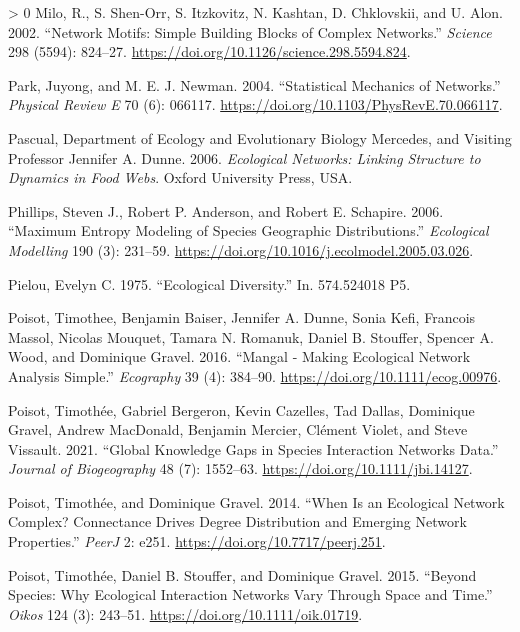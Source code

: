 \documentclass[11pt]{article}
\newlength{\cslhangindent}
\newenvironment{CSLReferences}[3] %
 {%
  \setlength{\parindent}{0pt}
  \ifodd #1 \everypar{\setlength{\hangindent}{\cslhangindent}}\ignorespaces\fi
  \ifnum #2 > 0
  \setlength{\parskip}{#2\baselineskip}
  \fi
 }%
 {}
\begin{document}
\begin{CSLReferences}{1}{0}
\leavevmode\hypertarget{ref-Milo2002NetMot}{}%
Milo, R., S. Shen-Orr, S. Itzkovitz, N. Kashtan, D. Chklovskii, and U.
Alon. 2002. {``Network Motifs: Simple Building Blocks of Complex
Networks.''} \emph{Science} 298 (5594): 824--27.
\url{https://doi.org/10.1126/science.298.5594.824}.

\leavevmode\hypertarget{ref-Park2004StaMeca}{}%
Park, Juyong, and M. E. J. Newman. 2004. {``Statistical Mechanics of
Networks.''} \emph{Physical Review E} 70 (6): 066117.
\url{https://doi.org/10.1103/PhysRevE.70.066117}.

\leavevmode\hypertarget{ref-Pascual2006EcoNeta}{}%
Pascual, Department of Ecology and Evolutionary Biology Mercedes, and
Visiting Professor Jennifer A. Dunne. 2006. \emph{Ecological Networks:
Linking Structure to Dynamics in Food Webs}. Oxford University Press,
USA.

\leavevmode\hypertarget{ref-Phillips2006MaxEnta}{}%
Phillips, Steven J., Robert P. Anderson, and Robert E. Schapire. 2006.
{``Maximum Entropy Modeling of Species Geographic Distributions.''}
\emph{Ecological Modelling} 190 (3): 231--59.
\url{https://doi.org/10.1016/j.ecolmodel.2005.03.026}.

\leavevmode\hypertarget{ref-Pielou1975EcoDiv}{}%
Pielou, Evelyn C. 1975. {``Ecological Diversity.''} In. 574.524018 P5.

\leavevmode\hypertarget{ref-Poisot2016ManMakb}{}%
Poisot, Timothee, Benjamin Baiser, Jennifer A. Dunne, Sonia Kefi,
Francois Massol, Nicolas Mouquet, Tamara N. Romanuk, Daniel B. Stouffer,
Spencer A. Wood, and Dominique Gravel. 2016. {``Mangal - Making
Ecological Network Analysis Simple.''} \emph{Ecography} 39 (4): 384--90.
\url{https://doi.org/10.1111/ecog.00976}.

\leavevmode\hypertarget{ref-Poisot2021GloKno}{}%
Poisot, Timothée, Gabriel Bergeron, Kevin Cazelles, Tad Dallas,
Dominique Gravel, Andrew MacDonald, Benjamin Mercier, Clément Violet,
and Steve Vissault. 2021. {``Global Knowledge Gaps in Species
Interaction Networks Data.''} \emph{Journal of Biogeography} 48 (7):
1552--63. \url{https://doi.org/10.1111/jbi.14127}.

\leavevmode\hypertarget{ref-Poisot2014WheEcoa}{}%
Poisot, Timothée, and Dominique Gravel. 2014. {``When Is an Ecological
Network Complex? Connectance Drives Degree Distribution and Emerging
Network Properties.''} \emph{PeerJ} 2: e251.
\url{https://doi.org/10.7717/peerj.251}.

\leavevmode\hypertarget{ref-Poisot2015SpeWhya}{}%
Poisot, Timothée, Daniel B. Stouffer, and Dominique Gravel. 2015.
{``Beyond Species: Why Ecological Interaction Networks Vary Through
Space and Time.''} \emph{Oikos} 124 (3): 243--51.
\url{https://doi.org/10.1111/oik.01719}.


\end{CSLReferences}
\end{document}
